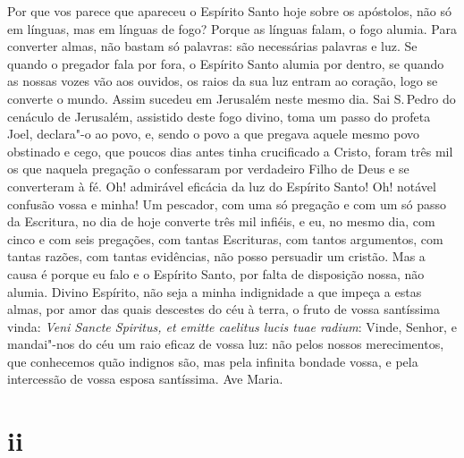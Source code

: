 Por que vos parece que apareceu o Espírito Santo hoje sobre os
apóstolos, não só em línguas, mas em línguas de fogo? Porque as línguas
falam, o fogo alumia. Para converter almas, não bastam só palavras: são
necessárias palavras e luz. Se quando o pregador fala por fora, o
Espírito Santo alumia por dentro, se quando as nossas vozes vão aos
ouvidos, os raios da sua luz entram ao coração, logo se converte o
mundo. Assim sucedeu em Jerusalém neste mesmo dia. Sai S.\,Pedro do
cenáculo de Jerusalém, assistido deste fogo divino, toma um passo do
profeta Joel, declara"-o ao povo, e, sendo o povo a que pregava aquele
mesmo povo obstinado e cego, que poucos dias antes tinha crucificado a
Cristo, foram três mil os que naquela pregação o confessaram por
verdadeiro Filho de Deus e se converteram à fé. Oh! admirável eficácia
da luz do Espírito Santo! Oh! notável confusão vossa e minha! Um
pescador, com uma só pregação e com um só passo da Escritura, no dia de
hoje converte três mil infiéis, e eu, no mesmo dia, com cinco e com seis
pregações, com tantas Escrituras, com tantos argumentos, com tantas
razões, com tantas evidências, não posso persuadir um cristão. Mas a
causa é porque eu falo e o Espírito Santo, por falta de disposição
nossa, não alumia. Divino Espírito, não seja a minha indignidade a que
impeça a estas almas, por amor das quais descestes do céu à terra, o
fruto de vossa santíssima vinda: \emph{Veni Sancte Spiritus, et emitte
caelitus lucis tuae radium}: Vinde, Senhor, e mandai"-nos do céu um raio
eficaz de vossa luz: não pelos nossos merecimentos, que conhecemos
quão indignos são, mas pela infinita bondade vossa, e pela intercessão
de vossa esposa santíssima. Ave Maria.

\section{ii}


